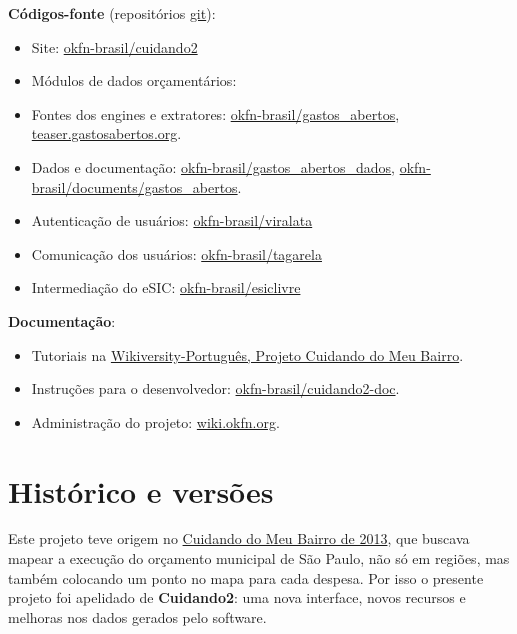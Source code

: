 \documentclass[letterpaper,10pt,english]{sphinxmanual}
\begin{document}
\textbf{Códigos-fonte} (repositórios \href{https://pt.wikipedia.org/wiki/Git}{git}):
\begin{itemize}
\item {} 
Site:
\href{https://github.com/okfn-brasil/cuidando2}{okfn-brasil/cuidando2}

\item {} 
Módulos de dados orçamentários:

\item {} 
Fontes dos engines e extratores:
\href{https://github.com/okfn-brasil/gastos\_abertos}{okfn-brasil/gastos\_abertos},
\href{https://github.com/okfn-brasil/teaser.gastosabertos.org}{teaser.gastosabertos.org}.

\item {} 
Dados e documentação:
\href{https://github.com/okfn-brasil/gastos\_abertos\_dados}{okfn-brasil/gastos\_abertos\_dados},
\href{https://github.com/okfn-brasil/documents/blob/master/gastos\_abertos}{okfn-brasil/documents/gastos\_abertos}.

\item {} 
Autenticação de usuários:
\href{https://github.com/okfn-brasil/viralata}{okfn-brasil/viralata}

\item {} 
Comunicação dos usuários:
\href{https://github.com/okfn-brasil/tagarela}{okfn-brasil/tagarela}

\item {} 
Intermediação do eSIC:
\href{https://github.com/okfn-brasil/esiclivre}{okfn-brasil/esiclivre}

\end{itemize}

\textbf{Documentação}:
\begin{itemize}
\item {} 
Tutoriais na \href{https://pt.wikiversity.org/wiki/Projeto\_Cuidando\_do\_Meu\_Bairro}{Wikiversity-Português, Projeto Cuidando do Meu
Bairro}.

\item {} 
Instruções para o desenvolvedor:
\href{https://github.com/okfn-brasil/cuidando2-doc}{okfn-brasil/cuidando2-doc}.

\item {} 
Administração do projeto:
\href{http://wiki.okfn.org/Open\_Knowledge\_Brasil/Gastos\_Abertos}{wiki.okfn.org}.

\end{itemize}


\chapter{Histórico e versões}
\label{index:historico-e-versoes}
Este projeto teve origem no \href{http://cuidando.org.br}{Cuidando do Meu Bairro de
2013}, que buscava mapear a execução do
orçamento municipal de São Paulo, não só em regiões, mas também
colocando um ponto no mapa para cada despesa. Por isso o presente
projeto foi apelidado de \textbf{Cuidando2}: uma nova interface, novos
recursos e melhoras nos dados gerados pelo software.
\end{document}
